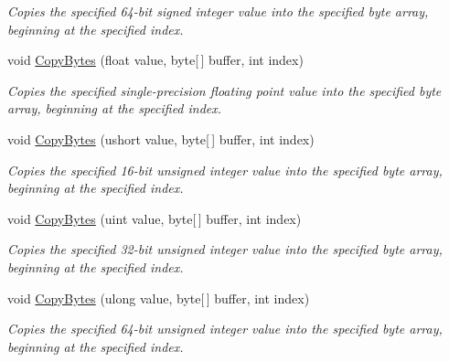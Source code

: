 \begin{DoxyCompactItemize}
\begin{DoxyCompactList}\small\item\em Copies the specified 64-\/bit signed integer value into the specified byte array, beginning at the specified index. \end{DoxyCompactList}\item 
void \mbox{\hyperlink{class_t_net_1_1_i_o_1_1_endian_bit_converter_a1ec7134c73cfee7f092697f372d59bf8}{Copy\+Bytes}} (float value, byte\mbox{[}$\,$\mbox{]} buffer, int index)
\begin{DoxyCompactList}\small\item\em Copies the specified single-\/precision floating point value into the specified byte array, beginning at the specified index. \end{DoxyCompactList}\item 
void \mbox{\hyperlink{class_t_net_1_1_i_o_1_1_endian_bit_converter_a47c89c95d05c3916ad3394dd1174a907}{Copy\+Bytes}} (ushort value, byte\mbox{[}$\,$\mbox{]} buffer, int index)
\begin{DoxyCompactList}\small\item\em Copies the specified 16-\/bit unsigned integer value into the specified byte array, beginning at the specified index. \end{DoxyCompactList}\item 
void \mbox{\hyperlink{class_t_net_1_1_i_o_1_1_endian_bit_converter_a7d340813aa031aec33f9f8471a6f30b4}{Copy\+Bytes}} (uint value, byte\mbox{[}$\,$\mbox{]} buffer, int index)
\begin{DoxyCompactList}\small\item\em Copies the specified 32-\/bit unsigned integer value into the specified byte array, beginning at the specified index. \end{DoxyCompactList}\item 
void \mbox{\hyperlink{class_t_net_1_1_i_o_1_1_endian_bit_converter_a93127860a9864bfed93d1382cdccc732}{Copy\+Bytes}} (ulong value, byte\mbox{[}$\,$\mbox{]} buffer, int index)
\begin{DoxyCompactList}\small\item\em Copies the specified 64-\/bit unsigned integer value into the specified byte array, beginning at the specified index. \end{DoxyCompactList}\end{DoxyCompactItemize}
